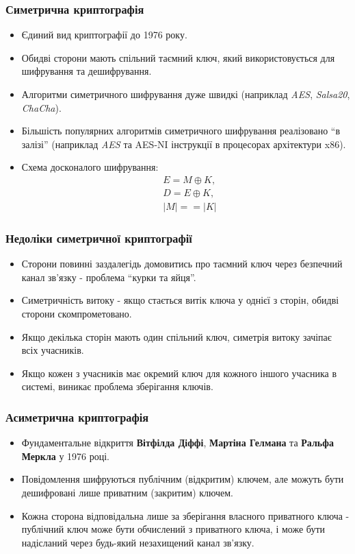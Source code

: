 \documentclass{beamer}
\begin{document}
\begin{frame}
  \frametitle{Симетрична криптографія}
  \begin{itemize}
  \item Єдиний вид криптографії до 1976 року.
  \item Обидві сторони мають спільний таємний ключ, який використовується для
    шифрування та дешифрування.
  \item Алгоритми симетричного шифрування дуже швидкі (наприклад \textit{AES},
    \textit{Salsa20}, \textit{ChaCha}).
  \item Більшість популярних алгоритмів симетричного шифрування реалізовано ``в залізі''
    (наприклад \textit{AES} та AES-NI інструкції в процесорах архітектури x86).
  \item Схема досконалого шифрування:
    \begin{align*}
      &E = M \oplus K, \\
      &D = E \oplus K, \\
      &|M| == |K|
    \end{align*}
  \end{itemize}
\end{frame}

\begin{frame}
  \frametitle{Недоліки симетричної криптографії}
  \begin{itemize}
  \item Сторони повинні заздалегідь домовитись про таємний ключ через безпечний
    канал зв'язку - проблема ``курки та яйця''.
  \item Симетричність витоку - якщо стається витік ключа у однієї з сторін,
    обидві сторони скомпрометовано.
  \item Якщо декілька сторін мають один спільний ключ, симетрія витоку зачіпає
    всіх учасників.
  \item Якщо кожен з учасників має окремий ключ для кожного іншого учасника в
    системі, виникає проблема зберігання ключів.
  \end{itemize}
\end{frame}

\begin{frame}
  \frametitle{Асиметрична криптографія}
  \begin{itemize}
  \item Фундаментальне відкриття \textbf{Вітфілда Діффі}, \textbf{Мартіна
      Гелмана} та \textbf{Ральфа Меркла} у 1976 році.
  \item Повідомлення шифруються публічним (відкритим) ключем, але можуть бути
    дешифровані лише приватним (закритим) ключем.
  \item Кожна сторона відповідальна лише за зберігання власного приватного ключа
    - публічний ключ може бути обчислений з приватного ключа, і може бути
    надісланий через будь-який незахищений канал зв'язку.
  \end{itemize}
\end{frame}
\end{document}
